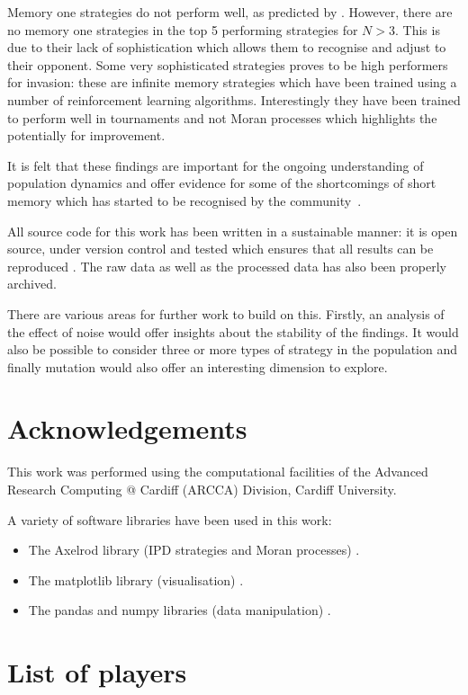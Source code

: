 \documentclass{article}
\begin{document}
Memory one strategies do not perform well, as predicted by \cite{Press2012}.
However, there are no memory one strategies in the top 5 performing strategies
for \(N>3\). This is due to their lack of sophistication which allows them to
recognise and adjust to their opponent. Some very sophisticated strategies
proves to be high performers for invasion: these are infinite memory strategies
which have been trained using a number of reinforcement learning algorithms.
Interestingly they have been trained to perform well in tournaments and not
Moran processes which highlights the potentially for improvement.

It is felt that these findings are important for the ongoing understanding of
population dynamics and offer evidence for some of the shortcomings of short
memory which has started to be recognised by the community~\cite{Hilbe2017}.

All source code for this work has been written in a sustainable manner: it is
open source, under version control and tested which ensures that all results can
be reproduced \cite{Prlic2012, Sandve2013, Wilson2014}. The raw data as well as
the processed data has also been properly archived.

There are various areas for further work to build on this. Firstly, an analysis
of the effect of noise would offer insights about the stability of the findings.
It would also be possible to consider three or more types of strategy in the
population and finally mutation would also offer an interesting dimension to
explore.

\section*{Acknowledgements}

This work was performed using the computational facilities of the Advanced
Research Computing @ Cardiff (ARCCA) Division, Cardiff University.

A variety of software libraries have been used in this work:

\begin{itemize}
    \item The Axelrod library (IPD strategies and Moran processes)
        \cite{axelrodproject}.
    \item The matplotlib library (visualisation) \cite{hunter2007matplotlib}.
    \item The pandas and numpy libraries (data manipulation)
        \cite{mckinney2010data, walt2011numpy}.
\end{itemize}

\printbibliography

\appendix

\section{List of players}\label{app:list_of_players}

\begin{multicols}{3}
	\begin{enumerate}
		
	\end{enumerate}
\end{multicols}
\end{document}
